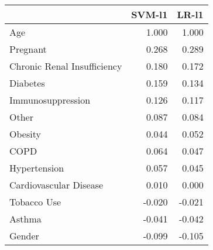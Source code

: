 \begin{tabular}{lrr}
\toprule
{} &  SVM-l1 &  LR-l1 \\
\midrule
Age                         &   1.000 &  1.000 \\
Pregnant                    &   0.268 &  0.289 \\
Chronic Renal Insufficiency &   0.180 &  0.172 \\
Diabetes                    &   0.159 &  0.134 \\
Immunosuppression           &   0.126 &  0.117 \\
Other                       &   0.087 &  0.084 \\
Obesity                     &   0.044 &  0.052 \\
COPD                        &   0.064 &  0.047 \\
Hypertension                &   0.057 &  0.045 \\
Cardiovascular Disease      &   0.010 &  0.000 \\
Tobacco Use                 &  -0.020 & -0.021 \\
Asthma                      &  -0.041 & -0.042 \\
Gender                      &  -0.099 & -0.105 \\
\bottomrule
\end{tabular}
